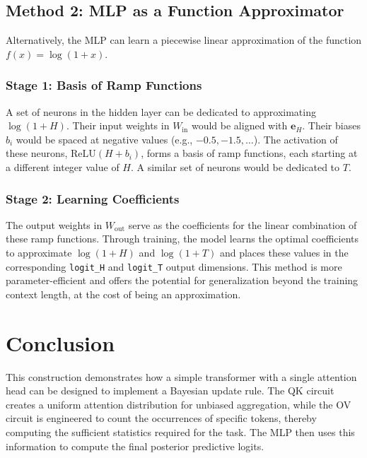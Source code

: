 \documentclass{article}
\begin{document}
\subsection{Method 2: MLP as a Function Approximator}
Alternatively, the MLP can learn a piecewise linear approximation of the function $f(x) = \log(1+x)$.

\subsubsection{Stage 1: Basis of Ramp Functions}
A set of neurons in the hidden layer can be dedicated to approximating $\log(1+H)$. Their input weights in $W_{\text{in}}$ would be aligned with $\mathbf{e}_H$. Their biases $b_i$ would be spaced at negative values (e.g., $-0.5, -1.5, \dots$). The activation of these neurons, $\text{ReLU}(H + b_i)$, forms a basis of ramp functions, each starting at a different integer value of $H$. A similar set of neurons would be dedicated to $T$.

\subsubsection{Stage 2: Learning Coefficients}

The output weights in $W_{\text{out}}$ serve as the coefficients for the linear combination of these ramp functions. Through training, the model learns the optimal coefficients to approximate $\log(1+H)$ and $\log(1+T)$ and places these values in the corresponding \texttt{logit\_H} and \texttt{logit\_T} output dimensions. This method is more parameter-efficient and offers the potential for generalization beyond the training context length, at the cost of being an approximation.

\section{Conclusion}
This construction demonstrates how a simple transformer with a single attention head can be designed to implement a Bayesian update rule. The QK circuit creates a uniform attention distribution for unbiased aggregation, while the OV circuit is engineered to count the occurrences of specific tokens, thereby computing the sufficient statistics required for the task. The MLP then uses this information to compute the final posterior predictive logits.
\end{document}
